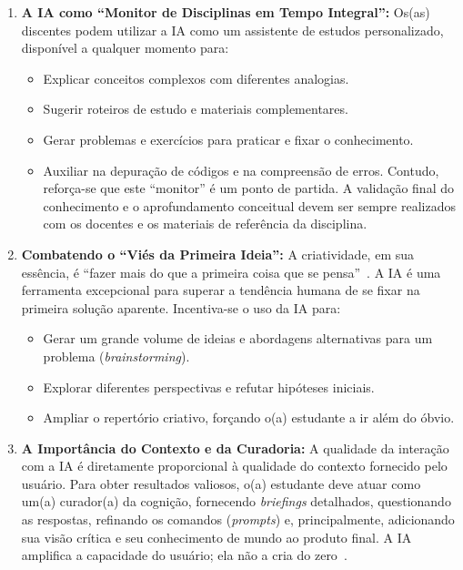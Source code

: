 \begin{enumerate}
    \item \textbf{A IA como ``Monitor de Disciplinas em Tempo Integral'':} Os(as) discentes podem utilizar a IA como um assistente de estudos personalizado, disponível a qualquer momento para:
    \begin{itemize}
        \item Explicar conceitos complexos com diferentes analogias.

        \item Sugerir roteiros de estudo e materiais complementares.

        \item Gerar problemas e exercícios para praticar e fixar o conhecimento.

        \item Auxiliar na depuração de códigos e na compreensão de erros.
        Contudo, reforça-se que este ``monitor'' é um ponto de partida. A validação final do conhecimento e o aprofundamento conceitual devem ser sempre realizados com os docentes e os materiais de referência da disciplina.
    \end{itemize}

    \item \textbf{Combatendo o ``Viés da Primeira Ideia'':} A criatividade, em sua essência, é ``fazer mais do que a primeira coisa que se pensa''~\cite{Utley2025}. A IA é uma ferramenta excepcional para superar a tendência humana de se fixar na primeira solução aparente. Incentiva-se o uso da IA para:
    \begin{itemize}
        \item Gerar um grande volume de ideias e abordagens alternativas para um problema (\textit{brainstorming}).

        \item Explorar diferentes perspectivas e refutar hipóteses iniciais.

        \item Ampliar o repertório criativo, forçando o(a) estudante a ir além do óbvio.
    \end{itemize}

    \item \textbf{A Importância do Contexto e da Curadoria:} A qualidade da interação com a IA é diretamente proporcional à qualidade do contexto fornecido pelo usuário. Para obter resultados valiosos, o(a) estudante deve atuar como um(a) curador(a) da cognição, fornecendo \textit{briefings} detalhados, questionando as respostas, refinando os comandos (\textit{prompts}) e, principalmente, adicionando sua visão crítica e seu conhecimento de mundo ao produto final. A IA amplifica a capacidade do usuário; ela não a cria do zero~\cite{Utley2025}.
\end{enumerate}


